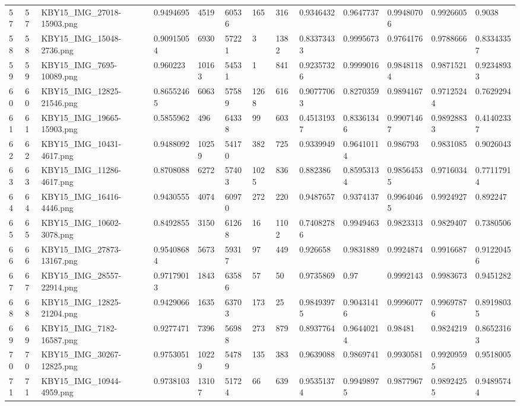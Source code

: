 \documentclass[11pt, a4paper, twoside]{report}
\begin{document}
\begin{longtable}[c]{@{}lllllllllllll@{}}
57 & 57 & KBY15\_IMG\_27018-15903.png & 0.9494695 & 4519 & 60536 & 165 & 316 & 0.9346432 & 0.9647737 & 0.99480706 & 0.9926605 & 0.9038 \\
58 & 58 & KBY15\_IMG\_15048-2736.png & 0.90915054 & 6930 & 57221 & 3 & 1382 & 0.83373433 & 0.9995673 & 0.9764176 & 0.9788666 & 0.83343357 \\
59 & 59 & KBY15\_IMG\_7695-10089.png & 0.960223 & 10163 & 54531 & 1 & 841 & 0.92357326 & 0.9999016 & 0.98481184 & 0.9871521 & 0.92348933 \\
60 & 60 & KBY15\_IMG\_12825-21546.png & 0.86552465 & 6063 & 57589 & 1268 & 616 & 0.90777063 & 0.8270359 & 0.9894167 & 0.97125244 & 0.7629294 \\
61 & 61 & KBY15\_IMG\_19665-15903.png & 0.5855962 & 496 & 64338 & 99 & 603 & 0.45131937 & 0.83361346 & 0.99071467 & 0.98928833 & 0.41402337 \\
62 & 62 & KBY15\_IMG\_10431-4617.png & 0.9488092 & 10259 & 54170 & 382 & 725 & 0.9339949 & 0.96410114 & 0.986793 & 0.9831085 & 0.9026043 \\
63 & 63 & KBY15\_IMG\_11286-4617.png & 0.8708088 & 6272 & 57403 & 1025 & 836 & 0.882386 & 0.85953134 & 0.98564535 & 0.9716034 & 0.77117914 \\
64 & 64 & KBY15\_IMG\_16416-4446.png & 0.9430555 & 4074 & 60970 & 272 & 220 & 0.9487657 & 0.9374137 & 0.99640465 & 0.9924927 & 0.892247 \\
65 & 65 & KBY15\_IMG\_10602-3078.png & 0.8492855 & 3150 & 61268 & 16 & 1102 & 0.74082786 & 0.9949463 & 0.9823313 & 0.9829407 & 0.7380506 \\
66 & 66 & KBY15\_IMG\_27873-13167.png & 0.95408684 & 5673 & 59317 & 97 & 449 & 0.926658 & 0.9831889 & 0.9924874 & 0.9916687 & 0.91220456 \\
67 & 67 & KBY15\_IMG\_28557-22914.png & 0.97179013 & 1843 & 63586 & 57 & 50 & 0.9735869 & 0.97 & 0.9992143 & 0.9983673 & 0.9451282 \\
68 & 68 & KBY15\_IMG\_12825-21204.png & 0.9429066 & 1635 & 63703 & 173 & 25 & 0.98493975 & 0.90431416 & 0.9996077 & 0.99697876 & 0.89198035 \\
69 & 69 & KBY15\_IMG\_7182-16587.png & 0.9277471 & 7396 & 56988 & 273 & 879 & 0.8937764 & 0.96440214 & 0.98481 & 0.9824219 & 0.86523163 \\
70 & 70 & KBY15\_IMG\_30267-12825.png & 0.9753051 & 10229 & 54789 & 135 & 383 & 0.9639088 & 0.9869741 & 0.9930581 & 0.99209595 & 0.9518005 \\
71 & 71 & KBY15\_IMG\_10944-4959.png & 0.9738103 & 13107 & 51724 & 66 & 639 & 0.95351374 & 0.99498975 & 0.9877967 & 0.98924255 & 0.94895744 \\

\end{longtable}
\end{document}
